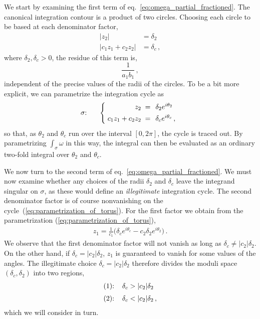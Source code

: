 \documentclass[dvipsnames,preprint,12pt,sort&compress]{elsarticle}
\begin{document}
We start by examining the first term of eq.~\eqref{eq:omega_partial_fractioned}.
The canonical integration contour is a product of two circles. Choosing each circle
to be based at each denominator factor,
\begin{align}
|z_2|               &=  \delta_2 \\
|c_1 z_1 + c_2 z_2| &=  \delta_c \,,
\end{align}
where $\delta_2, \delta_c > 0$, the residue of this term is,
\begin{equation}
\frac{1}{a_1 b_1}\,,
\end{equation}
independent of the precise values of the radii of the circles.
To be a bit more explicit, we can parametrize the integration cycle as
\begin{equation}
\sigma{:} \hspace{6mm} \left\{ \hspace{-0.7mm}
\begin{array}{rl}
z_2                \hspace{1mm} =&  \hspace{-1mm} \delta_2 e^{i\theta_2} \\[1.5mm]
c_1 z_1 + c_2 z_2  \hspace{1mm} =&  \hspace{-1mm} \delta_c e^{i\theta_c} \,,
\label{eq:parametrization_of_torus}
\end{array}
\right.
\end{equation}
so that, as $\theta_2$ and $\theta_c$ run over the interval $[0,2\pi]$, the cycle is
traced out. By parametrizing $\int_\sigma \omega$ in this way, the integral can then
be evaluated as an ordinary two-fold integral over $\theta_2$ and $\theta_c$.

We now turn to the second term of eq.~\eqref{eq:omega_partial_fractioned}.
We must now examine whether any choices of the radii $\delta_2$ and $\delta_c$
leave the integrand singular on $\sigma$, as these would define an
\emph{illegitimate} integration cycle. The second denominator factor is of course
nonvanishing on the cycle~(\ref{eq:parametrization_of_torus}).
For the first factor we obtain from the parametrization (\ref{eq:parametrization_of_torus}),
\begin{align}
z_1 = \frac{1}{c_1} \big( \delta_c e^{i\theta_c} - c_2 \delta_2 e^{i\theta_2} \big) \,.
\label{eq:z_1_contour}
\end{align}
We observe that the first denominator factor will not vanish as long
as $\delta_c\neq |c_2|\delta_2$. On the other hand, if
$\delta_c = |c_2|\delta_2$, $z_1$ is guaranteed to vanish for some values of
the angles. The illegitimate choice $\delta_c = |c_2|\delta_2$ therefore divides the
moduli space $(\delta_c,\delta_2)$ into two regions,
\begin{equation}
\begin{aligned}
\mathrm{(1){:}} \hspace{4mm} \delta_c &> |c_2|\delta_2 \\[1mm]
\mathrm{(2){:}} \hspace{4mm} \delta_c &< |c_2|\delta_2\,,
\label{eq:regions_of_torus_moduli_space}
\end{aligned}
\end{equation}
which we will consider in turn.
\end{document}
